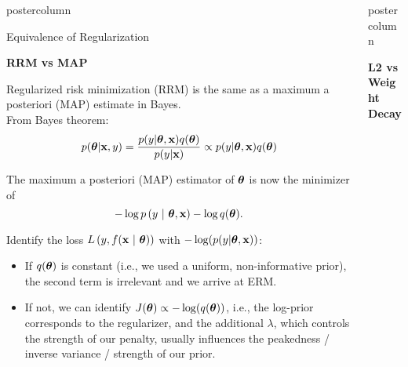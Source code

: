 \documentclass{beamer}
\newlength{\columnheight} %
\begin{document}
\begin{frame}[fragile]{}
\begin{columns}
\begin{column}{.31\textwidth}
\begin{beamercolorbox}[center]{postercolumn}
\begin{minipage}{.98\textwidth}
{\begin{myblock}{}
\end{myblock}
\begin{myblock}{Equivalence of Regularization}

  \begin{codebox}
\textbf{RRM vs MAP}
\end{codebox}
Regularized risk minimization (RRM) is the same as a maximum a posteriori (MAP) estimate in Bayes.\\

From Bayes theorem:
$$
p(\bm{\theta} | \mathbf{x}, y) = \frac{p(y | \bm{\theta}, \mathbf{x}) q(\bm{\theta}) }{p(y | \mathbf{x})} \propto 
p(y | \bm{\theta}, \mathbf{x}) q(\bm{\theta})
$$

The maximum a posteriori (MAP) estimator of $\bm{\theta}$ is now the minimizer of
$$
- \log p\left(y ~|~ \bm{\theta}, \mathbf{x}\right) - \log q(\bm{\theta}).
$$

Identify the loss $L\left(y, f(\mathbf{x} ~|~ \bm{\theta})\right)$ with $-\log(p(y | \bm{\theta}, \mathbf{x}))$:
\begin{itemize}[$\bullet$]
  \setlength{\itemindent}{+.3in}
 \item If $q(\bm{\theta})$ is constant (i.e., we used a uniform, non-informative 
  prior), the second term is irrelevant and we arrive at ERM.
  \item If not, we can identify $J(\bm{\theta}) \propto -\log(q(\bm{\theta}))$, i.e., 
  the log-prior corresponds to the regularizer, and the additional $\lambda$, which controls the strength of our
  penalty, usually influences the peakedness / inverse variance / strength of our prior.
\end{itemize}

\end{myblock}

				}
			\end{minipage}
		\end{beamercolorbox}
	\end{column}
	

\begin{column}{.31\textwidth}
\begin{beamercolorbox}[center]{postercolumn}
\begin{minipage}{.98\textwidth}
\parbox[t][\columnheight]{\textwidth}{

\begin{myblock}{ }
  
   \begin{codebox}
\textbf{L2 vs Weight Decay}
\end{codebox}


\end{myblock}}
\end{minipage}
\end{beamercolorbox}
\end{column}
\end{columns}
\end{frame}
\end{document}
